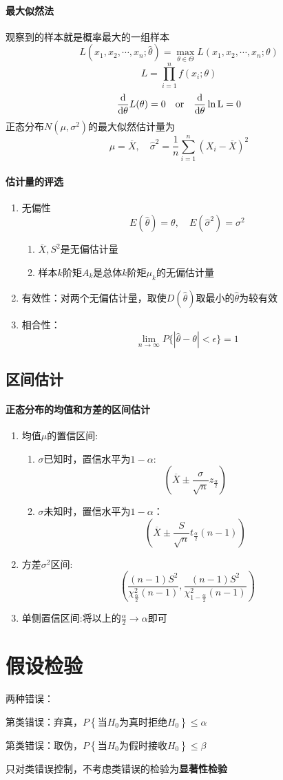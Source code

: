 \documentclass[12pt]{report}
\newcommand{\Rmnum}[1]{\MakeUppercase{\romannumeral #1}}
\begin{document}
\paragraph{最大似然法}
观察到的样本就是概率最大的一组样本
$$L(x_1,x_2,\cdots,x_n;\hat{\theta})=\max_{\theta \in \varTheta} L(x_1,x_2,\cdots,x_n;\theta)$$
$$L=\prod_{i=1}^n f(x_i;\theta)$$
$$\frac{\mathrm{d}}{\mathrm{d}\theta}L(\theta)=0 \quad \rm{or} \quad \frac{d}{d\theta}\ln L=0$$
正态分布$N(\mu,\sigma^2)$的最大似然估计量为$$\hat{\mu}=\overline{X},\quad \hat{\sigma}^2=\frac{1}{n}\sum_{i=1}^n (X_i-\overline{X})^2$$
\paragraph{估计量的评选}
\begin{enumerate}
    \item 无偏性$$E(\hat{\theta})=\theta,\quad E(\hat{\sigma}^2)=\sigma^2$$
    \begin{enumerate}
        \item $\overline{X},S^2$是无偏估计量
        \item 样本$k$阶矩$A_k$是总体$k$阶矩$\mu_k$的无偏估计量
    \end{enumerate}
    \item 有效性：对两个无偏估计量，取使$D(\hat{\theta})$取最小的$\hat{\theta}$为较有效
    \item 相合性：$$\lim_{n\rightarrow \infty} P\{|\hat{\theta}-\theta|<\epsilon\}=1$$
\end{enumerate}

\subsection{区间估计}

\paragraph{正态分布的均值和方差的区间估计}
\begin{enumerate}
    \item 均值$\mu$的置信区间:
    \begin{enumerate}
        \item $\sigma$已知时，置信水平为$1-\alpha$:$$\left(\overline{X}\pm \frac{\sigma}{\sqrt{n}} z_{\frac{\alpha}{2}}\right)$$
        \item $\sigma$未知时，置信水平为$1-\alpha$：$$\left(\overline{X}\pm \frac{S}{\sqrt{n}} t_{\frac{\alpha}{2}}(n-1)\right)$$
    \end{enumerate}
    \item 方差$\sigma^2$区间:$$\left(\frac{(n-1)S^2}{\chi_{\frac{\alpha}{2}}^2(n-1)},\frac{(n-1)S^2}{\chi_{1-{\frac{\alpha}{2}}}^2(n-1)}\right)$$
    \item 单侧置信区间:将以上的$\frac{\alpha}{2} \rightarrow \alpha$即可
\end{enumerate}

\section{假设检验}
两种错误：\par
第\Rmnum{1}类错误：弃真，$P\left\{\mbox{当$H_0$为真时拒绝$H_0$}\right\}\leqslant \alpha$\par
第\Rmnum{2}类错误：取伪，$P\left\{\mbox{当$H_0$为假时接收$H_0$}\right\}\leqslant \beta$\par
只对\Rmnum{1}类错误控制，不考虑\Rmnum{2}类错误的检验为\textbf{显著性检验}
\end{document}
